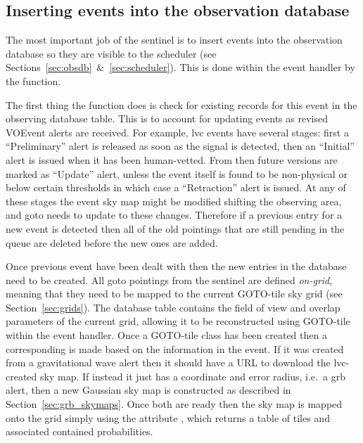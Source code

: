 \begin{colsection}
\begin{colsection}
\end{colsection}


\subsection{Inserting events into the observation database}
\label{sec:db_insert}
\begin{colsection}

The most important job of the sentinel is to insert events into the observation database so they are visible to the scheduler (see Sections~\ref{sec:obsdb}~\&~\ref{sec:scheduler}). This is done within the event handler by the  function.

The first thing the  function does is check for existing records for this event in the observing database  table. This is to account for updating events as revised VOEvent alerts are received. For example, \gls{lvc} events have several stages: first a ``Preliminary'' alert is released as soon as the signal is detected, then an ``Initial'' alert is issued when it has been human-vetted. From then future versions are marked as ``Update'' alert, unless the event itself is found to be non-physical or below certain thresholds in which case a ``Retraction'' alert is issued. At any of these stages the event sky map might be modified shifting the observing area, and \gls{goto} needs to update to these changes. Therefore if a previous entry for a new event is detected then all of the old pointings that are still pending in the queue are deleted before the new ones are added.

Once previous event have been dealt with then the new entries in the database need to be created. All \gls{goto} pointings from the sentinel are defined \textit{on-grid}, meaning that they need to be mapped to the current GOTO-tile sky grid (see Section~\ref{sec:grids}). The database  table contains the field of view and overlap parameters of the current grid, allowing it to be reconstructed using GOTO-tile within the event handler. Once a GOTO-tile  class has been created then a corresponding  is made based on the information in the event. If it was created from a gravitational wave alert then it should have a URL to download the \gls{lvc}-created sky map. If instead it just has a coordinate and error radius, i.e.\ a \gls{grb} alert, then a new Gaussian sky map is constructed as described in Section~\ref{sec:grb_skymaps}. Once both are ready then the sky map is mapped onto the grid simply using the attribute , which returns a table of tiles and associated contained probabilities. %


\end{colsection}
\end{colsection}
